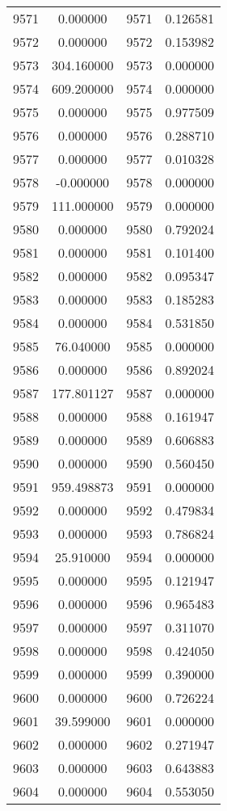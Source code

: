 \documentclass[12pt]{article}
\begin{document}
\begin{longtable}{@{}cccc@{}}
9571 & 0.000000 & 9571 & 0.126581 \\
9572 & 0.000000 & 9572 & 0.153982 \\
9573 & 304.160000 & 9573 & 0.000000 \\
9574 & 609.200000 & 9574 & 0.000000 \\
9575 & 0.000000 & 9575 & 0.977509 \\
9576 & 0.000000 & 9576 & 0.288710 \\
9577 & 0.000000 & 9577 & 0.010328 \\
9578 & -0.000000 & 9578 & 0.000000 \\
9579 & 111.000000 & 9579 & 0.000000 \\
9580 & 0.000000 & 9580 & 0.792024 \\
9581 & 0.000000 & 9581 & 0.101400 \\
9582 & 0.000000 & 9582 & 0.095347 \\
9583 & 0.000000 & 9583 & 0.185283 \\
9584 & 0.000000 & 9584 & 0.531850 \\
9585 & 76.040000 & 9585 & 0.000000 \\
9586 & 0.000000 & 9586 & 0.892024 \\
9587 & 177.801127 & 9587 & 0.000000 \\
9588 & 0.000000 & 9588 & 0.161947 \\
9589 & 0.000000 & 9589 & 0.606883 \\
9590 & 0.000000 & 9590 & 0.560450 \\
9591 & 959.498873 & 9591 & 0.000000 \\
9592 & 0.000000 & 9592 & 0.479834 \\
9593 & 0.000000 & 9593 & 0.786824 \\
9594 & 25.910000 & 9594 & 0.000000 \\
9595 & 0.000000 & 9595 & 0.121947 \\
9596 & 0.000000 & 9596 & 0.965483 \\
9597 & 0.000000 & 9597 & 0.311070 \\
9598 & 0.000000 & 9598 & 0.424050 \\
9599 & 0.000000 & 9599 & 0.390000 \\
9600 & 0.000000 & 9600 & 0.726224 \\
9601 & 39.599000 & 9601 & 0.000000 \\
9602 & 0.000000 & 9602 & 0.271947 \\
9603 & 0.000000 & 9603 & 0.643883 \\
9604 & 0.000000 & 9604 & 0.553050 \\

\end{longtable}
\end{document}
